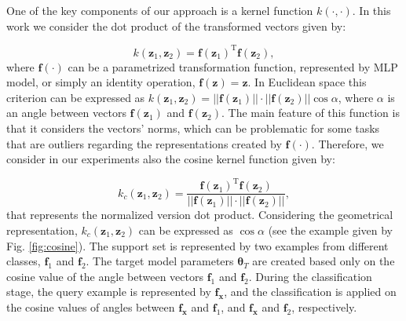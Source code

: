 \documentclass[nohyperref]{article}
\theoremstyle{plain}
\theoremstyle{definition}
\theoremstyle{remark}
\begin{document}
One of the key components of our approach is a kernel function $k(\cdot, \cdot)$. In this work we consider the dot product of the transformed vectors given by:

\begin{equation}
k(\mathbf{z}_1, \mathbf{z}_2)=\mathbf{f}(\mathbf{z}_1)^{\mathrm{T}} \mathbf{f}(\mathbf{z}_2),
\label{eq:kernel}
\end{equation}
where $\mathbf{f}(\cdot)$ can be a parametrized transformation function, represented by MLP model, or simply an identity operation, $\mathbf{f}(\mathbf{z})=\mathbf{z}$. In Euclidean space this criterion can be expressed as $k(\mathbf{z}_1, \mathbf{z}_2)=||\mathbf{f}(\mathbf{z}_1)|| \cdot||\mathbf{f}(\mathbf{z}_2)|| \cos{\alpha}$, where $\alpha$ is an angle between vectors $\mathbf{f}(\mathbf{z}_1)$ and $\mathbf{f}(\mathbf{z}_2)$. The main feature of this function is that it considers the vectors' norms, which can be problematic for some tasks that are outliers regarding the representations created by $\mathbf{f}(\cdot)$. Therefore, we consider in our experiments also the cosine kernel function given by:

\begin{equation}
k_{c}(\mathbf{z}_1, \mathbf{z}_2)=\frac{\mathbf{f}(\mathbf{z}_1)^{\mathrm{T}}\mathbf{f}(\mathbf{z}_2)}{||\mathbf{f}(\mathbf{z}_1)|| \cdot ||\mathbf{f}(\mathbf{z}_2)||} ,
\end{equation}
that represents the normalized version dot product. Considering the geometrical representation, $k_{c}(\mathbf{z}_1, \mathbf{z}_2)$ can be expressed as $\cos{\alpha}$ (see the example given by Fig. \ref{fig:cosine}). The support set is represented by two examples from different classes, $\mathbf{f}_1$ and $\mathbf{f}_2$. The target model parameters $\boldsymbol{\theta}_{T}$ are created based only on the cosine value of the angle between vectors $\mathbf{f}_1$ and $\mathbf{f}_2$. During the classification stage, the query example is represented by $\mathbf{f}_{\mathbf{x}}$, and the classification is applied on the cosine values of angles between $\mathbf{f}_{\mathbf{x}}$ and $\mathbf{f}_1$, and $\mathbf{f}_{\mathbf{x}}$ and $\mathbf{f}_2$, respectively. 
\end{document}
